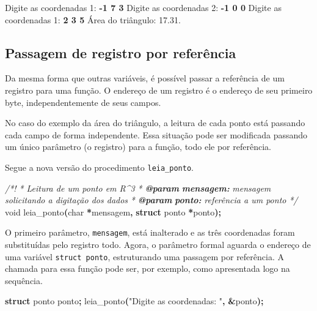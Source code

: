 \documentclass[
  11pt,
  a4paper,
]{scrbook}
\newenvironment{Shaded}{\begin{snugshade}}{\end{snugshade}}
\newcommand{\AnnotationTok}[1]{\textcolor[rgb]{0.56,0.35,0.01}{\textbf{\textit{#1}}}}
\newcommand{\CommentTok}[1]{\textcolor[rgb]{0.56,0.35,0.01}{\textit{#1}}}
\newcommand{\CommentVarTok}[1]{\textcolor[rgb]{0.56,0.35,0.01}{\textbf{\textit{#1}}}}
\newcommand{\DataTypeTok}[1]{\textcolor[rgb]{0.13,0.29,0.53}{#1}}
\newcommand{\KeywordTok}[1]{\textcolor[rgb]{0.13,0.29,0.53}{\textbf{#1}}}
\newcommand{\NormalTok}[1]{#1}
\newcommand{\OperatorTok}[1]{\textcolor[rgb]{0.81,0.36,0.00}{\textbf{#1}}}
\newcommand{\StringTok}[1]{\textcolor[rgb]{0.31,0.60,0.02}{#1}}
\begin{document}
\begin{Shaded}
\begin{Highlighting}[]
\NormalTok{Digite as coordenadas 1: }\KeywordTok{ {-}1 7 3 }
\NormalTok{Digite as coordenadas 2: }\KeywordTok{ {-}1 0 0 }
\NormalTok{Digite as coordenadas 1: }\KeywordTok{ 2 3 5 }
\NormalTok{Área do triângulo: 17.31.}
\end{Highlighting}
\end{Shaded}

\subsection{Passagem de registro por
referência}\label{passagem-de-registro-por-referuxeancia}

Da mesma forma que outras variáveis, é possível passar a referência de
um registro para uma função. O endereço de um registro é o endereço de
seu primeiro byte, independentemente de seus campos.

No caso do exemplo da área do triângulo, a leitura de cada ponto está
passando cada campo de forma independente. Essa situação pode ser
modificada passando um único parâmetro (o registro) para a função, todo
ele por referência.

Segue a nova versão do procedimento \texttt{leia\_ponto}.

\begin{Shaded}
\begin{Highlighting}[]
\CommentTok{/*!}
\CommentTok{ * Leitura de um ponto em R\^{}3}
\CommentTok{ * }\AnnotationTok{@param}\CommentTok{ }\CommentVarTok{mensagem:}\CommentTok{ mensagem solicitando a digitação dos dados}
\CommentTok{ * }\AnnotationTok{@param}\CommentTok{ }\CommentVarTok{ponto:}\CommentTok{ referência a um ponto}
\CommentTok{ */}
\DataTypeTok{void}\NormalTok{ leia\_ponto}\OperatorTok{(}\DataTypeTok{char} \OperatorTok{*}\NormalTok{mensagem}\OperatorTok{,} \KeywordTok{struct}\NormalTok{ ponto }\OperatorTok{*}\NormalTok{ponto}\OperatorTok{);}
\end{Highlighting}
\end{Shaded}

O primeiro parâmetro, \texttt{mensagem}, está inalterado e as três
coordenadas foram substituídas pelo registro todo. Agora, o parâmetro
formal aguarda o endereço de uma variável \texttt{struct\ ponto},
estruturando uma passagem por referência. A chamada para essa função
pode ser, por exemplo, como apresentada logo na sequência.

\begin{Shaded}
\begin{Highlighting}[]
\KeywordTok{struct}\NormalTok{ ponto ponto}\OperatorTok{;}
\NormalTok{leia\_ponto}\OperatorTok{(}\StringTok{"Digite as coordenadas: "}\OperatorTok{,} \OperatorTok{\&}\NormalTok{ponto}\OperatorTok{);}
\end{Highlighting}
\end{Shaded}
\end{document}
